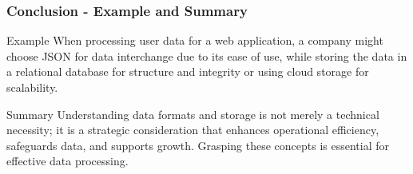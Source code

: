 \documentclass[aspectratio=169]{beamer}
\begin{document}
\begin{frame}[fragile]
    \frametitle{Conclusion - Example and Summary}
    \begin{block}{Example}
        When processing user data for a web application, a company might choose JSON for data interchange due to its ease of use, while storing the data in a relational database for structure and integrity or using cloud storage for scalability.
    \end{block}
    
    \begin{block}{Summary}
        Understanding data formats and storage is not merely a technical necessity; it is a strategic consideration that enhances operational efficiency, safeguards data, and supports growth. Grasping these concepts is essential for effective data processing.
    \end{block}
\end{frame}
\end{document}
